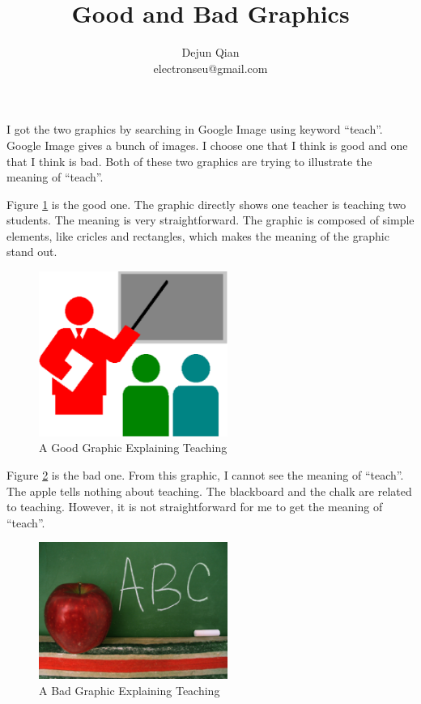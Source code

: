 \documentclass[11pt,letterpaper,oneside]{article}
\title{Good and Bad Graphics}
\author{Dejun Qian\\electronseu@gmail.com}
\date{}
\begin{document}
\maketitle


I got the two graphics by searching in Google Image using keyword ``teach''. Google Image gives a bunch of images. I choose one that I think is good and one that I think is bad. Both of these two graphics are trying to illustrate the meaning of ``teach''.

Figure \ref{fig:good} \cite{bib:good} is the good one. The graphic directly shows one teacher is teaching two students. The meaning is very straightforward. The graphic is composed of simple elements, like cricles and rectangles, which makes the meaning of the graphic stand out.

\begin{figure}
\begin{center}
\includegraphics[width=0.55\textwidth]{teaching.eps}
\caption{A Good Graphic Explaining Teaching}
\label{fig:good}
\end{center}
\end{figure}

Figure \ref{fig:bad} \cite{bib:bad} is the bad one. From this graphic, I cannot see the meaning of ``teach''. The apple tells nothing about teaching. The blackboard and the chalk are related to teaching. However, it is not straightforward for me to get the meaning of ``teach''.

\begin{figure}
\begin{center}
\includegraphics[width=0.55\textwidth]{teach-for-america.eps}
\caption{A Bad Graphic Explaining Teaching}
\label{fig:bad}
\end{center}
\end{figure}




\end{document}
